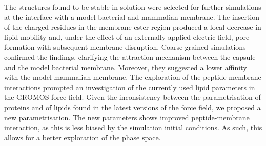 \begin{onehalfspacing}
The structures found to be stable in solution were selected for further simulations at the interface with a model bacterial and mammalian membrane.
%
The insertion of the charged residues in the membrane ester region produced a local decrease in lipid mobility and, under the effect of an externally applied electric field, pore formation with subsequent membrane disruption.
%
Coarse-grained simulations confirmed the findings, clarifying the attraction mechanism between the capsule and the model bacterial membrane. Moreover, they suggested a lower affinity with the model mammalian membrane.
%
The exploration of the peptide-membrane interactions prompted an investigation of the currently used lipid parameters in the GROMOS force field. Given the inconsistency between the parametrisation of proteins and of lipids found in the latest versions of the force field, we proposed a new parametrisation. The new parameters shows improved peptide-membrane interaction, as this is less biased by the simulation initial conditions. As such, this allows for a better exploration of the phase space.

\end{onehalfspacing}


\cleardoublepage
\newpage
\thispagestyle{plain} %
\mbox{}

 
\tableofcontents*

\cleardoublepage

\listoffigures*

\cleardoublepage

\listoftables*



\newlength{\nomitemorigsep}
\setlength{\nomitemorigsep}{\nomitemsep}
\setlength{\nomitemsep}{-\parsep}

\renewcommand{\nomgroup}[1]{
%
\itemsep\nomitemorigsep
\ifthenelse{\equal{#1}{A}}{\item[\textbf{Acronyms}]}{
%
\ifthenelse{\equal{#1}{B}}{\item[\textbf{ccc}]}{
%
\ifthenelse{\equal{#1}{K}}{\item[\textbf{vvv}]}{
}}}
\itemsep\nomitemsep}


\printnomenclature[7.6em]

\cleardoublepage
\newpage
\thispagestyle{plain} %
\mbox{}


\thispagestyle{empty}





